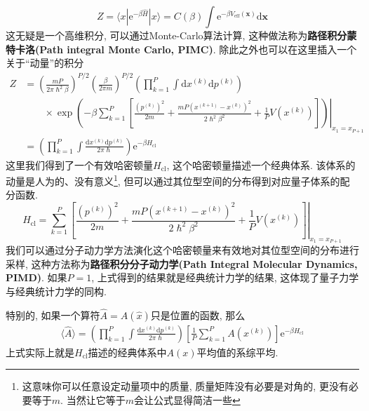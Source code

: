         \begin{equation}
            Z = \langle x|\mathrm{e}^{-\beta \hat{H}}|x\rangle = C(\beta) \int \mathrm{e}^{-\beta V_\mathrm{eff}(\bm{x})} \mathrm{d}\bm{x}
        \end{equation}
        这无疑是一个高维积分, 可以通过Monte-Carlo算法计算, 这种做法称为\textbf{路径积分蒙特卡洛(Path integral Monte Carlo, PIMC)}. 除此之外也可以在这里插入一个关于“动量”的积分
        \begin{equation}\begin{aligned}
            Z &= \left(\frac{mP}{2\pi \hslash^2 \beta}\right)^{P/2} \left(\frac{\beta}{2\pi m}\right)^{P/2} \left( \prod_{k=1}^{P} \int \mathrm{d} x^{(k)} \mathrm{d} p^{(k)} \right) \\ & \qquad\times\left.
            \exp\left( -\beta \sum_{k=1}^{P} \left[\frac{(p^{(k)})^2}{2m}+\frac{mP(x^{(k+1)}-x^{(k)})^2}{2\hslash^2 \beta^2}+\frac{1}{P}V(x^{(k)})\right]\right)\right|_{x_1 = x_{P+1}} \\
            &= \left( \prod_{k=1}^{P} \int \frac{\mathrm{d} x^{(k)} \mathrm{d} p^{(k)}}{2\pi\hslash}  \right) \mathrm{e}^{-\beta H_\mathrm{cl}}
        \end{aligned}\end{equation}
        这里我们得到了一个有效哈密顿量$H_\mathrm{cl}$, 这个哈密顿量描述一个经典体系. 该体系的动量是人为的、没有意义\footnote{这意味你可以任意设定动量项中的质量, 质量矩阵没有必要是对角的, 更没有必要等于$m$. 当然让它等于$m$会让公式显得简洁一些}, 但可以通过其位型空间的分布得到对应量子体系的配分函数. 
        \begin{equation}
            H_\mathrm{cl} = \left. \sum_{k=1}^{P} \left[\frac{(p^{(k)})^2}{2m}+\frac{mP(x^{(k+1)}-x^{(k)})^2}{2\hslash^2 \beta^2}+\frac{1}{P}V(x^{(k)})\right] \right|_{x_1 = x_{P+1}}
        \end{equation}
        我们可以通过分子动力学方法演化这个哈密顿量来有效地对其位型空间的分布进行采样, 这种方法称为\textbf{路径积分分子动力学(Path Integral Molecular Dynamics, PIMD)}. 如果$P=1$, 上式得到的结果就是经典统计力学的结果, 这体现了量子力学与经典统计力学的同构. 

        特别的, 如果一个算符$\hat{A} = A(\hat x)$只是位置的函数, 那么
        \begin{equation}\begin{aligned}
            \langle {\hat A} \rangle = \left( \prod_{k=1}^{P} \int \frac{\mathrm{d} x^{(k)} \mathrm{d} p^{(k)}}{2\pi\hslash}  \right)  \left[ \frac1P\sum_{k=1}^{P}A(x^{(k)}) \right] \mathrm{e}^{-\beta H_\mathrm{cl}}
        \end{aligned}\end{equation}
        上式实际上就是$H_\mathrm{cl}$描述的经典体系中$A(x)$平均值的系综平均.

